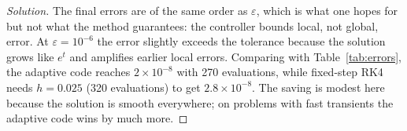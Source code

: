 \documentclass[11pt]{article}
\theoremstyle{definition}
\newenvironment{solution}{\begin{proof}[Solution]}{\end{proof}}
\begin{document}
\begin{solution}
The final errors are of the same order as $\varepsilon$, which is what one hopes for but not what the method guarantees: the controller bounds local, not global, error. At $\varepsilon = 10^{-6}$ the error slightly exceeds the tolerance because the solution grows like $e^t$ and amplifies earlier local errors. Comparing with Table~\ref{tab:errors}, the adaptive code reaches $2\times10^{-8}$ with 270 evaluations, while fixed-step RK4 needs $h = 0.025$ (320 evaluations) to get $2.8\times10^{-8}$. The saving is modest here because the solution is smooth everywhere; on problems with fast transients the adaptive code wins by much more.
\end{solution}
\end{document}
